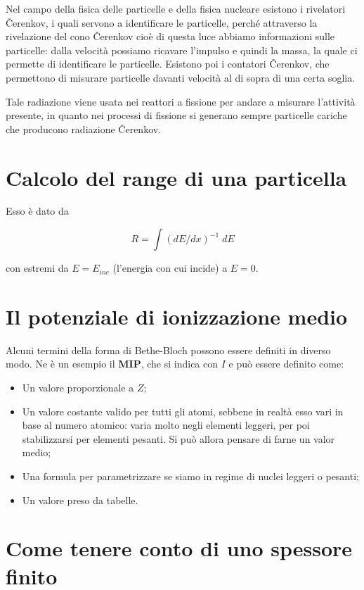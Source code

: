 Nel campo della fisica delle particelle e della fisica nucleare esistono i rivelatori Čerenkov, i quali servono a identificare le particelle, perché attraverso la rivelazione del cono Čerenkov cioè di questa luce abbiamo informazioni sulle particelle: dalla velocità possiamo ricavare l'impulso e quindi la massa, la quale ci permette di identificare le particelle. Esistono poi i contatori Čerenkov, che permettono di misurare particelle davanti velocità al di sopra di una certa soglia.

Tale radiazione viene usata nei reattori a fissione per andare a misurare l'attività presente, in quanto nei processi di fissione si generano sempre particelle cariche che producono radiazione Čerenkov.

\section{Calcolo del range di una particella}

Esso è dato da

$$R=\int (dE/dx)^{-1}\;dE$$

con estremi da $E=E_{inc}$ (l'energia con cui incide) a $E=0$.

\section{Il potenziale di ionizzazione medio}

Alcuni termini della forma di Bethe-Bloch possono essere definiti in diverso modo. Ne è un esempio il \textbf{MIP}, che si indica con $I$ e può essere definito come:

\begin{itemize}
    \item Un valore proporzionale a $Z$;
    \item Un valore costante valido per tutti gli atomi, sebbene in realtà esso vari in base al numero atomico: varia molto negli elementi leggeri, per poi stabilizzarsi per elementi pesanti. Si può allora pensare di farne un valor medio;
    \item Una formula per parametrizzare se siamo in regime di nuclei leggeri o pesanti;
    \item Un valore preso da tabelle.
\end{itemize}

\section{Come tenere conto di uno spessore finito}

